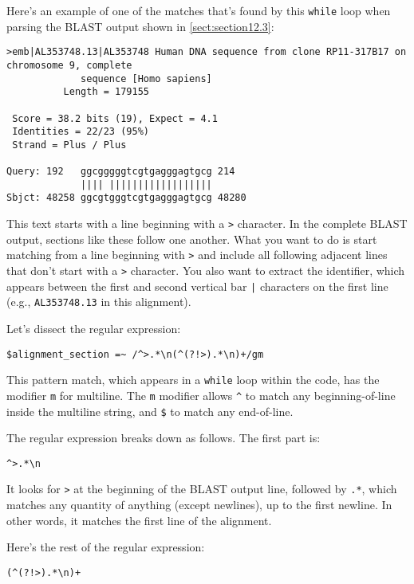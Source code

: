 Here's an example of one of the matches that's found by this \verb|while| loop when parsing the BLAST output shown in \autoref{sect:section12.3}:

\begin{lstlisting}
>emb|AL353748.13|AL353748 Human DNA sequence from clone RP11-317B17 on
chromosome 9, complete
             sequence [Homo sapiens]
          Length = 179155

 Score = 38.2 bits (19), Expect = 4.1
 Identities = 22/23 (95%)
 Strand = Plus / Plus

Query: 192   ggcgggggtcgtgagggagtgcg 214
             |||| ||||||||||||||||||
Sbjct: 48258 ggcgtgggtcgtgagggagtgcg 48280
\end{lstlisting}

This text starts with a line beginning with a \verb|>| character. In the complete BLAST output, sections like these follow one another. What you want to do is start matching from a line beginning with \verb|>| and include all following adjacent lines that don't start with a \verb|>| character. You also want to extract the identifier, which appears between the first and second vertical bar \verb=|= characters on the first line (e.g., \verb|AL353748.13| in this alignment).

Let's dissect the regular expression:

\begin{lstlisting}
$alignment_section =~ /^>.*\n(^(?!>).*\n)+/gm
\end{lstlisting}

This pattern match, which appears in a \verb|while| loop within the code, has the modifier \verb|m| for multiline. The \verb|m| modifier allows \verb|^| to match any beginning-of-line inside the multiline string, and \verb|$| to match any end-of-line.

The regular expression breaks down as follows. The first part is:

\begin{lstlisting}
^>.*\n
\end{lstlisting}

It looks for \verb|>| at the beginning of the BLAST output line, followed by \verb|.*|, which matches any quantity of anything (except newlines), up to the first newline. In other words, it matches the first line of the alignment.

Here's the rest of the regular expression:

\begin{lstlisting}
(^(?!>).*\n)+
\end{lstlisting}

